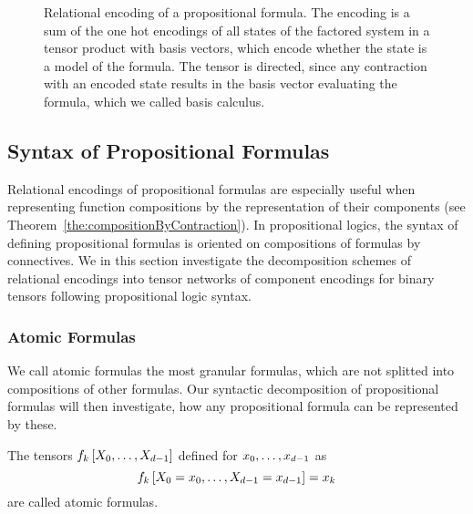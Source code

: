 \begin{figure}[h]
\begin{center}
	
\end{center}
\caption{Relational encoding of a propositional formula. 
The encoding is a sum of the one hot encodings of all states of the factored system in a tensor product with basis vectors, which encode whether the state is a model of the formula.
The tensor is directed, since any contraction with an encoded state results in the basis vector evaluating the formula, which we called basis calculus.
}
\label{fig:formulaRencoding} 
\end{figure}










\subsection{Syntax of Propositional Formulas}

Relational encodings of propositional formulas are especially useful when representing function compositions by the representation of their components (see Theorem~\ref{the:compositionByContraction}). 
In propositional logics, the syntax of defining propositional formulas is oriented on compositions of formulas by connectives. %
We in this section investigate the decomposition schemes of relational encodings into tensor networks of component encodings for binary tensors following propositional logic syntax.

\subsubsection{Atomic Formulas}

We call atomic formulas the most granular formulas, which are not splitted into compositions of other formulas.
Our syntactic decomposition of propositional formulas will then investigate, how any propositional formula can be represented by these.

\begin{definition}
	The tensors $f_{k}\left[X_{0},\ldots,X_{d-1}\right]$ defined for $x_{0},\ldots,x_{d-1}$ as
		\[ f_{k}\left[X_{0}=x_{0},\ldots,X_{d-1}=x_{d-1}\right] = x_{k} \]
	are called atomic formulas.
\end{definition}


